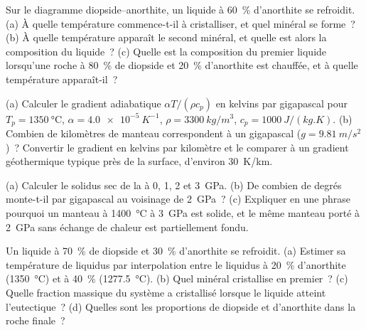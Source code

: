 \begin{exercise}[$\star$]\label{exo:b2:mantle-melting:2}
Sur le diagramme diopside--anorthite, un liquide à \qty{60}{\percent} d'anorthite
se refroidit. (a) À quelle température commence-t-il à cristalliser, et quel minéral
se forme~? (b) À quelle température apparaît le second minéral, et quelle est alors
la composition du liquide~? (c) Quelle est la composition du premier liquide lorsqu'une
roche à \qty{80}{\percent} de diopside et \qty{20}{\percent} d'anorthite est chauffée,
et à quelle température apparaît-il~?
\end{exercise}

\begin{exercise}[$\star$]\label{exo:b2:mantle-melting:3}
(a) Calculer le gradient adiabatique $\alpha T/(\rho c_p)$ en kelvins par gigapascal
pour $T_p = \qty{1350}{\celsius}$, $\alpha = \qty{4.0e-5}{K^{-1}}$, $\rho =
\qty{3300}{kg/m^3}$, $c_p = \qty{1000}{J/(kg.K)}$. (b) Combien de kilomètres de
manteau correspondent à un gigapascal ($g = \qty{9.81}{m/s^2}$)~? Convertir le gradient en kelvins
par kilomètre et le comparer à un gradient géothermique typique près de la surface,
d'environ \qty{30}{K/km}.
\end{exercise}

\begin{exercise}[$\star$]\label{exo:b2:mantle-melting:4}
(a) Calculer le solidus sec de la  à 0, 1, 2 et \qty{3}{GPa}. (b) De combien de degrés
monte-t-il par gigapascal au voisinage de \qty{2}{GPa}~? (c) Expliquer en une phrase pourquoi un manteau à
\qty{1400}{\celsius} à \qty{3}{GPa} est solide, et le même manteau porté à \qty{2}{GPa} sans
échange de chaleur est partiellement fondu.
\end{exercise}

\begin{exercise}[$\star\star$]\label{exo:b2:mantle-melting:5}
Un liquide à \qty{70}{\percent} de diopside et \qty{30}{\percent} d'anorthite se refroidit.
(a) Estimer sa température de liquidus par interpolation entre le liquidus à
\qty{20}{\percent} d'anorthite (\qty{1350}{\celsius}) et à \qty{40}{\percent}
(\qty{1277.5}{\celsius}). (b) Quel minéral cristallise en premier~? (c) Quelle fraction
massique du système a cristallisé lorsque le liquide atteint l'eutectique~?
(d) Quelles sont les proportions de diopside et d'anorthite dans la roche finale~?
\end{exercise}

